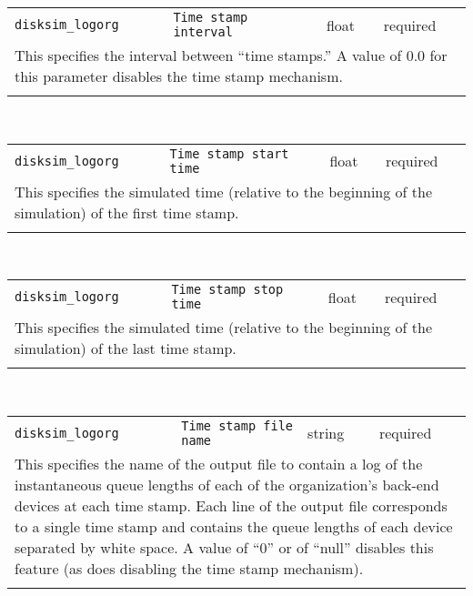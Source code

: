 \noindent 
\begin{tabular}{|p{1.5in}|p{3.5in}|p{0.5in}|p{0.5in}|}
\cline{1-4}
\texttt{disksim\_logorg} & \texttt{Time stamp interval} & float & required \\ 
\cline{1-4}
\multicolumn{4}{|p{6in}|}{
This specifies the interval between ``time stamps.'' A value of $0.0$ for
this parameter disables the time stamp mechanism.
}\\ 
\cline{1-4}
\multicolumn{4}{p{5in}}{}\\
\end{tabular}\\ 
\noindent 
\begin{tabular}{|p{1.5in}|p{3.5in}|p{0.5in}|p{0.5in}|}
\cline{1-4}
\texttt{disksim\_logorg} & \texttt{Time stamp start time} & float & required \\ 
\cline{1-4}
\multicolumn{4}{|p{6in}|}{
This specifies the simulated time (relative to the beginning of the
simulation) of the first time stamp.
}\\ 
\cline{1-4}
\multicolumn{4}{p{5in}}{}\\
\end{tabular}\\ 
\noindent 
\begin{tabular}{|p{1.5in}|p{3.5in}|p{0.5in}|p{0.5in}|}
\cline{1-4}
\texttt{disksim\_logorg} & \texttt{Time stamp stop time} & float & required \\ 
\cline{1-4}
\multicolumn{4}{|p{6in}|}{
This specifies the simulated time (relative to the beginning of the
simulation) of the last time stamp.
}\\ 
\cline{1-4}
\multicolumn{4}{p{5in}}{}\\
\end{tabular}\\ 
\noindent 
\begin{tabular}{|p{1.5in}|p{3.5in}|p{0.5in}|p{0.5in}|}
\cline{1-4}
\texttt{disksim\_logorg} & \texttt{Time stamp file name} & string & required \\ 
\cline{1-4}
\multicolumn{4}{|p{6in}|}{
This specifies the name of the output file to contain a log of the
instantaneous queue lengths of each of the organization's back-end
devices at each time stamp. Each line of the output file corresponds
to a single time stamp and contains the queue lengths of each device
separated by white space. A value of ``0'' or of ``null'' disables
this feature (as does disabling the time stamp mechanism).
}\\ 
\cline{1-4}
\multicolumn{4}{p{5in}}{}\\
\end{tabular}\\ 
